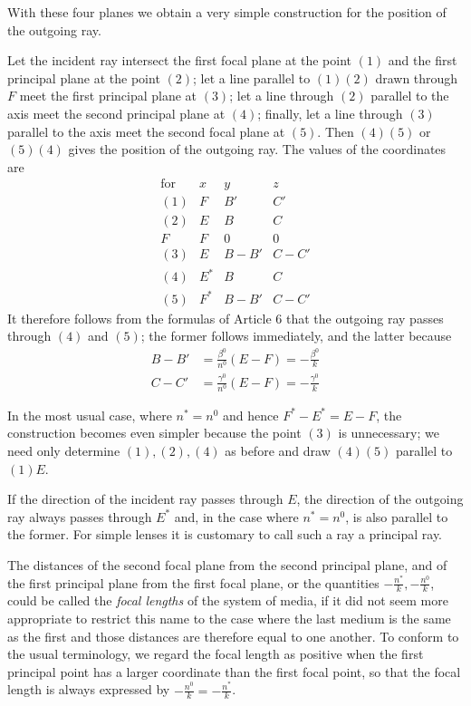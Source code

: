 With these four planes we obtain a very simple construction for the position of the outgoing ray.

Let the incident ray intersect the first focal plane at the point $(1)$ and the first principal plane at the point $(2)$; let a line parallel to $(1)(2)$ drawn through $F$ meet the first principal plane at $(3)$; let a line through $(2)$ parallel to the axis meet the second principal plane at $(4)$; finally, let a line through $(3)$ parallel to the axis meet the second focal plane at $(5)$. Then $(4)(5)$ or $(5)(4)$ gives the position of the outgoing ray. The values of the coordinates are
\[
\renewcommand{\arraystretch}{1.25}
\begin{array}{c||c|c|c}
\text{for}&x&y&z\\\hline
(1)&F&B'&C'\\
(2)&E&B&C\\
F&F&0&0\\
(3)&E&B-B'&C-C'\\
(4)&E^*&B&C\\
(5)&F^*&B-B'&C-C'
\end{array}
\]
It therefore follows from the formulas of Article 6 that the outgoing ray passes through $(4)$ and $(5)$; the former follows immediately, and the latter because
\[
\begin{aligned}
B-B'&=\frac{\beta^0}{n^0}(E-F)=-\frac{\beta^0}k\\
C-C'&=\frac{\gamma^0}{n^0}(E-F)=-\frac{\gamma^0}k
\end{aligned}
\]

In the most usual case, where $n^*=n^0$ and hence $F^*-E^*=E-F$, the construction becomes even simpler because the point $(3)$ is unnecessary; we need only determine $(1),(2),(4)$ as before and draw $(4)(5)$ parallel to $(1)E$.

If the direction of the incident ray passes through $E$, the direction of the outgoing ray always passes through $E^*$ and, in the case where $n^*=n^0$, is also parallel to the former. For simple lenses it is customary to call such a ray a principal ray.

The distances of the second focal plane from the second principal plane, and of the first principal plane from the first focal plane, or the quantities $-\frac{n^*}k,-\frac{n^0}k$, could be called the \textit{focal lengths} of the system of media, if it did not seem more appropriate to restrict this name to the case where the last medium is the same as the first and those distances are therefore equal to one another. To conform to the usual terminology, we regard the focal length as positive when the first principal point has a larger coordinate than the first focal point, so that the focal length is always expressed by $-\frac{n^0}k=-\frac{n^*}k$.

